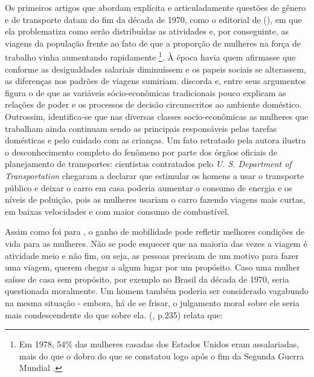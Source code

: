 Os primeiros artigos que abordam explícita e articuladamente questões de gênero e de transporte datam do fim da década de 1970, como o editorial de  (\citeyear{ROSENBLOOM1978}), em que ela problematiza como serão distribuídas as atividades e, por conseguinte, as viagens da população frente ao fato de que a proporção de mulheres na força de trabalho vinha aumentando rapidamente%
\footnote{Em 1978, 54\% das mulheres casadas dos Estados Unidos eram assalariadas, mais do que o dobro do que se constatou logo após o fim da Segunda Guerra Mundial \cite{ROSENBLOOM1978}.}. À época havia quem afirmasse que conforme as desigualdades salariais diminuíssem e os papeis sociais se alterassem, as diferenças nos padrões de viagens sumiriam.  discorda e, entre seus argumentos figura o de que as variáveis sócio-econômicas tradicionais pouco explicam as relações de poder e os processos de decisão circunscritos ao ambiente doméstico. Outrossim, identifica-se que nas diversas classes socio-econômicas as mulheres que trabalham ainda continuam sendo as principais responsáveis pelas tarefas domésticas e pelo cuidado com as crianças. Um fato retratado pela autora ilustra o desconhecimento completo do fenômeno por parte dos órgãos oficiais de planejamento de transportes: cientistas contratados pelo \emph{U. S. Department of Transportation} chegaram a declarar que estimular os homens a usar o transporte público e  deixar o carro em casa poderia aumentar o consumo de energia e os níveis de poluição, pois as mulheres usariam o carro fazendo viagens mais curtas, em baixas velocidades e com maior consumo de combustível.


Assim como foi para , o ganho de mobilidade pode refletir melhores condições de vida para as mulheres. Não se pode esquecer que na maioria das vezes a viagem é atividade meio e não fim, ou seja, as pessoas precisam de um motivo para fazer uma viagem, querem chegar a algum lugar por um propósito. Caso uma mulher saísse de casa sem propósito, por exemplo no Brasil da década de 1970, seria questionada moralmente. Um homem também poderia ser considerado vagabundo na mesma situação - embora, há de se frisar, o julgamento moral sobre ele seria mais condescendente do que sobre ela.  (\citeyear{DINCAO2012}, p.235) relata que: 

